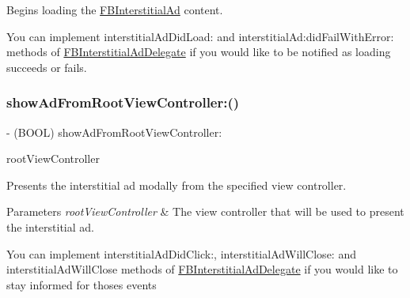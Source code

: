 Begins loading the \hyperlink{interfaceFBInterstitialAd}{F\+B\+Interstitial\+Ad} content.

You can implement {\ttfamily interstitial\+Ad\+Did\+Load\+:} and {\ttfamily interstitial\+Ad\+:did\+Fail\+With\+Error\+:} methods of {\ttfamily \hyperlink{classFBInterstitialAdDelegate-p}{F\+B\+Interstitial\+Ad\+Delegate}} if you would like to be notified as loading succeeds or fails. \mbox{\label{interfaceFBInterstitialAd_ac9c071a5f699e990e1fa65060fe5c1ce}} 
\subsubsection{\texorpdfstring{show\+Ad\+From\+Root\+View\+Controller\+:()}{showAdFromRootViewController:()}\hspace{0.1cm}{\footnotesize\ttfamily [1/5]}}
{\footnotesize\ttfamily -\/ (B\+O\+OL) show\+Ad\+From\+Root\+View\+Controller\+: \begin{DoxyParamCaption}\item[{(U\+I\+View\+Controller $\ast$)}]{root\+View\+Controller }\end{DoxyParamCaption}}

Presents the interstitial ad modally from the specified view controller.


\begin{DoxyParams}{Parameters}
{\em root\+View\+Controller} & The view controller that will be used to present the interstitial ad.\\
\hline
\end{DoxyParams}
You can implement {\ttfamily interstitial\+Ad\+Did\+Click\+:}, {\ttfamily interstitial\+Ad\+Will\+Close\+:} and {\ttfamily interstitial\+Ad\+Will\+Close} methods of {\ttfamily \hyperlink{classFBInterstitialAdDelegate-p}{F\+B\+Interstitial\+Ad\+Delegate}} if you would like to stay informed for thoses events \mbox{\label{interfaceFBInterstitialAd_ac9c071a5f699e990e1fa65060fe5c1ce}} 
